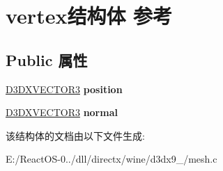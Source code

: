 \hypertarget{structvertex}{}\section{vertex结构体 参考}
\label{structvertex}
\subsection*{Public 属性}
\begin{DoxyCompactItemize}
\item 
\mbox{\label{structvertex_a31790a23fa5a88119283611d895b88e6}} 
\hyperlink{struct___d3_d_v_e_c_t_o_r}{D3\+D\+X\+V\+E\+C\+T\+O\+R3} {\bfseries position}
\item 
\mbox{\label{structvertex_a2e31a85ec5f268553cc4988a3416903b}} 
\hyperlink{struct___d3_d_v_e_c_t_o_r}{D3\+D\+X\+V\+E\+C\+T\+O\+R3} {\bfseries normal}
\end{DoxyCompactItemize}


该结构体的文档由以下文件生成\+:\begin{DoxyCompactItemize}
\item 
E\+:/\+React\+O\+S-\/0../dll/directx/wine/d3dx9\+\_/mesh.\+c\end{DoxyCompactItemize}
